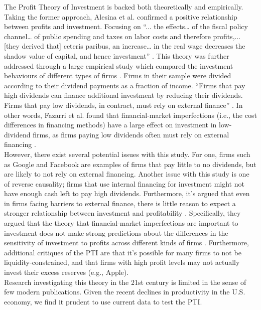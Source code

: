 The Profit Theory of Investment is backed both theoretically and empirically. Taking the former approach, Alesina et al. confirmed a positive relationship between profits and investment. Focusing on “... the effects… of the fiscal policy channel… of public spending and taxes on labor costs and therefore profits,... [they derived that] ceteris paribus, an increase… in the real wage decreases the shadow value of capital, and hence investment” \cite[Alesina et al., 1999]{Alesina1999}. This theory was further addressed through a large empirical study which compared the investment behaviours of different types of firms \cite[Fazzari et al., 1988]{Fazzari1988}. Firms in their sample were divided according to their dividend payments as a fraction of income. “Firms that pay high dividends can finance additional investment by reducing their dividends. Firms that pay low dividends, in contract, must rely on external finance” \cite[Romer, 2012]{Romer2012}. In other words, Fazarri et al. found that financial-market imperfections (i.e., the cost differences in financing methods) have a large effect on investment in low-dividend firms, as firms paying low dividends often must rely on external financing \cite[Fazzari et al., 1988]{Fazzari1988}. \\

However, there exist several potential issues with this study. For one, firms such as Google and Facebook are examples of firms that pay little to no dividends, but are likely to not rely on external financing. Another issue with this study is one of reverse causality; firms that use internal financing for investment might not have enough cash left to pay high dividends. Furthermore, it's argued that even in firms facing barriers to external finance, there is little reason to expect a stronger relationship between investment and profitability \cite[Kaplan and Zingales, 1997]{Kaplan1997}. Specifically, they argued that the theory that financial-market imperfections are important to investment does not make strong predictions about the differences in the sensitivity of investment to profits across different kinds of firms \cite[Kaplan and Zingales, 1997]{Kaplan1997}. Furthermore, additional critiques of the PTI are that it’s possible for many firms to not be liquidity-constrained, and that firms with high profit levels may not actually invest their excess reserves (e.g., Apple). \\

Research investigating this theory in the 21st century is limited in the sense of few modern publications. Given the recent declines in productivity in the U.S. economy, we find it prudent to use current data to test the PTI.

